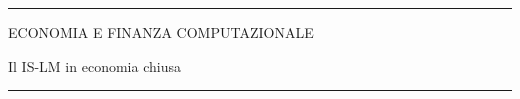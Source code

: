 \documentclass[12pt,aspectratio=169]{beamer}
\begin{document}
\begin{frame}
\unitlength 5mm

\begin{center}

\rule{\textwidth}{2pt}

\vskip3mm
ECONOMIA E FINANZA COMPUTAZIONALE

Il IS-LM in economia chiusa

\rule{\textwidth}{2pt}

\end{center}

\end{frame}


\end{document}
